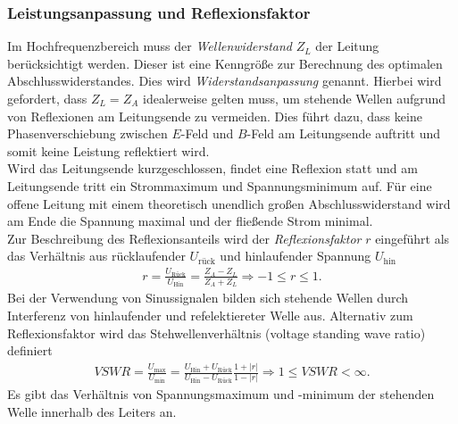 \documentclass[a4paper,twoside,final]{article}
\begin{document}
\subsubsection{Leistungsanpassung und Reflexionsfaktor}
Im Hochfrequenzbereich muss der \textit{Wellenwiderstand} $Z_L$ der Leitung berücksichtigt werden. Dieser ist eine Kenngröße zur Berechnung des optimalen Abschlusswiderstandes. Dies wird \textit{Widerstandsanpassung} genannt. Hierbei wird gefordert, dass $Z_L = Z_A$ idealerweise gelten muss, um stehende Wellen aufgrund von Reflexionen am Leitungsende zu vermeiden. Dies führt dazu, dass keine Phasenverschiebung zwischen $E$-Feld und $B$-Feld am Leitungsende auftritt und somit keine Leistung reflektiert wird.\\
Wird das Leitungsende kurzgeschlossen, findet eine Reflexion statt und am Leitungsende tritt ein Strommaximum und Spannungsminimum auf. Für eine offene Leitung mit einem theoretisch unendlich großen Abschlusswiderstand wird am Ende die Spannung maximal und der fließende Strom minimal.\\
Zur Beschreibung des Reflexionsanteils wird der \textit{Reflexionsfaktor} $r$ eingeführt als das Verhältnis aus rücklaufender $U_\text{rück}$ und hinlaufender Spannung $U_\text{hin}$
\begin{align}
  r=\frac{U_{\text{Rück}}}{U_{\text{Hin}}}=\frac{Z_{A}-Z_{L}}{Z_{A}+Z_{L}} \Rightarrow-1 \leq r \leq 1.
\end{align}
Bei der Verwendung von Sinussignalen bilden sich stehende Wellen durch Interferenz von hinlaufender und refelektiereter Welle aus. Alternativ zum Reflexionsfaktor wird das Stehwellenverhältnis  (voltage standing wave ratio) definiert
\begin{align}
  VSWR=\frac{U_{\max }}{U_{\min }}= \frac{U_\text{Hin}+U_\text{Rück}}{U_\text{Hin}-U_\text{Rück}}\frac{1+|r|}{1-|r|} \Rightarrow 1 \leq VSWR<\infty.
\end{align}
Es gibt das Verhältnis von Spannungsmaximum und -minimum der stehenden Welle innerhalb des Leiters an.
\end{document}
